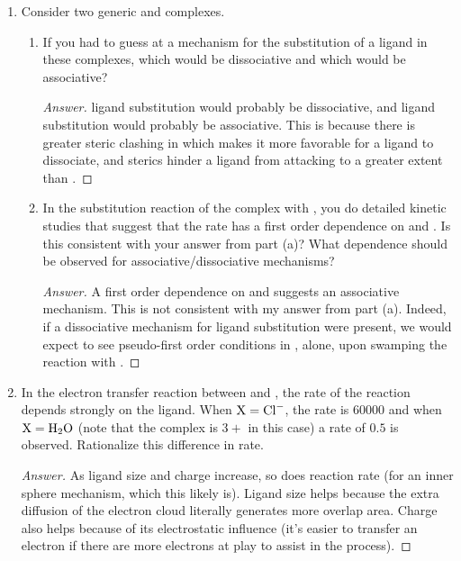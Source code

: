 \documentclass[../psets.tex]{subfiles}
\begin{document}
\begin{enumerate}
\begin{enumerate}
\begin{proof}[Answer]
        \end{proof}
    \end{enumerate}
    \item Consider two generic  and  complexes.
    \begin{enumerate}
        \item If you had to guess at a mechanism for the substitution of a ligand  in these complexes, which would be dissociative and which would be associative?
        \begin{proof}[Answer]
             ligand substitution would probably be dissociative, and  ligand substitution would probably be associative. This is because there is greater steric clashing in  which makes it more favorable for a ligand to dissociate, and sterics hinder a ligand  from attacking  to a greater extent than .
        \end{proof}
        \item In the substitution reaction of the  complex with , you do detailed kinetic studies that suggest that the rate has a first order dependence on \ce{[ML6]} and \ce{[L$'$]}. Is this consistent with your answer from part (a)? What dependence should be observed for associative/dissociative mechanisms?
        \begin{proof}[Answer]
            A first order dependence on \ce{[ML6]} and \ce{[L$'$]} suggests an associative mechanism. This is not consistent with my answer from part (a). Indeed, if a dissociative mechanism for  ligand substitution were present, we would expect to see pseudo-first order conditions in \ce{[ML6]}, alone, upon swamping the reaction with \ce{[L$'$]}.
        \end{proof}
    \end{enumerate}
    \item In the electron transfer reaction between  and , the rate of the reaction depends strongly on the  ligand. When $\ce{X}=\ce{Cl-}$, the rate is $\num{60000}$ and when $\ce{X}=\ce{H2O}$ (note that the complex is $3+$ in this case) a rate of $0.5$ is observed. Rationalize this difference in rate.
    \begin{proof}[Answer]
        As ligand size and charge increase, so does reaction rate (for an inner sphere mechanism, which this likely is). Ligand size helps because the extra diffusion of the electron cloud literally generates more overlap area. Charge also helps because of its electrostatic influence (it's easier to transfer an electron if there are more electrons at play to assist in the process).

\end{proof}
\end{enumerate}
\end{document}
